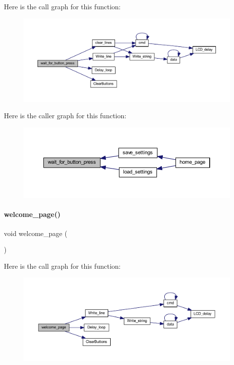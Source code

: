 Here is the call graph for this function\+:
\nopagebreak
\begin{figure}[H]
\begin{center}
\leavevmode
\includegraphics[width=350pt]{a00038_a59a5b2f0e89c6de897d4bd5d10bc8142_cgraph}
\end{center}
\end{figure}
Here is the caller graph for this function\+:
\nopagebreak
\begin{figure}[H]
\begin{center}
\leavevmode
\includegraphics[width=350pt]{a00038_a59a5b2f0e89c6de897d4bd5d10bc8142_icgraph}
\end{center}
\end{figure}
\mbox{\label{a00038_a723001bc88b48bfcff69fbe437fd73f5}} 
\paragraph{welcome\+\_\+page()}
{\footnotesize\ttfamily void welcome\+\_\+page (\begin{DoxyParamCaption}{ }\end{DoxyParamCaption})}

Here is the call graph for this function\+:
\nopagebreak
\begin{figure}[H]
\begin{center}
\leavevmode
\includegraphics[width=350pt]{a00038_a723001bc88b48bfcff69fbe437fd73f5_cgraph}
\end{center}
\end{figure}


